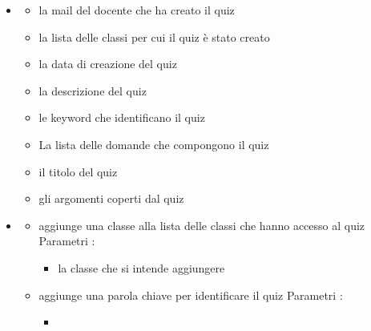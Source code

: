\begin{itemize}
\item {}
\begin{itemize}
\item {}
\newline
la mail del docente che ha creato il quiz
\item {}
\newline
la lista delle classi per cui il quiz è stato creato
\item {}
\newline
la data di creazione del quiz
\item {}
\newline
la descrizione del quiz
\item {}
\newline
le keyword che identificano il quiz
\item {}
\newline
La lista delle domande che compongono il quiz
\item {}
\newline
il titolo del quiz
\item {}
\newline
gli argomenti coperti dal quiz
\end{itemize}
\item {}
\begin{itemize}
\item {}
\newline
aggiunge una classe alla lista delle classi che hanno accesso al quiz
\newline
Parametri :
\begin{itemize}
\item {}
\newline
la classe che si intende aggiungere
\end{itemize}
\item {}
\newline
aggiunge una parola chiave per identificare il quiz
\newline
Parametri :
\begin{itemize}
\item {}
\newline

\end{itemize}
\end{itemize}
\end{itemize}
